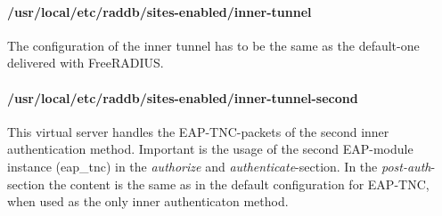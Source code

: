 \paragraph{/usr/local/etc/raddb/sites-enabled/inner-tunnel}
The configuration of the inner tunnel has to be the same as the default-one delivered with FreeRADIUS.

\paragraph{/usr/local/etc/raddb/sites-enabled/inner-tunnel-second}
This virtual server handles the EAP-TNC-packets of the second inner authentication method.
Important is the usage of the second EAP-module instance (eap\_tnc) in the \textit{authorize} and \textit{authenticate}-section.
In the \textit{post-auth}-section the content is the same as in the default configuration for EAP-TNC, when used as the only inner authenticaton method.

